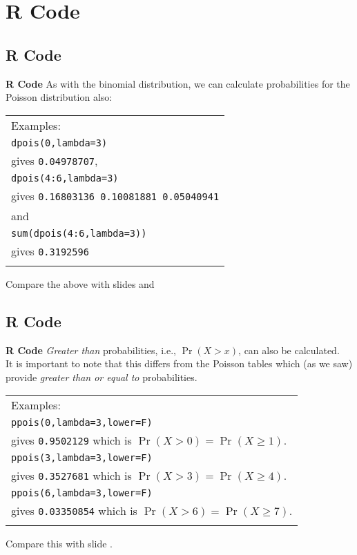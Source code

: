 \documentclass[compress]{beamer}        %
\makeatletter
\newcommand{\tcb}{\textcolor{beamer@blendedblue}}
\makeatother
\begin{document}
\section{R Code}
\subsection{R Code}
\begin{frame}{\bf \tcb{R Code}}
As with the binomial distribution, we can calculate probabilities for the Poisson distribution also:\\[0.3cm]

\begin{tabular}{|l|}
\hline
Examples: \\[0.2cm]
\texttt{dpois(0,lambda=3)} \\
gives \texttt{0.04978707}, \\[0.2cm]
\texttt{dpois(4:6,lambda=3)} \\
gives \texttt{0.16803136 0.10081881 0.05040941}\\[0.2cm]
and\\[0.2cm]
\texttt{sum(dpois(4:6,lambda=3))} \\
gives \texttt{0.3192596}\\
\hline
\multicolumn{1}{c}{}\\[0.1cm]
\end{tabular}

Compare the above with slides \pageref{poisexample} and \pageref{poisranexample}
\end{frame}



\subsection{R Code}
\begin{frame}{\bf \tcb{R Code}}
\emph{Greater than} probabilities, i.e., $\Pr(X > x)$, can also be calculated.\\[0.4cm]
It is important to note that this differs from the Poisson tables which (as we saw) provide \emph{greater than or equal to} probabilities.\\[0.4cm]

\begin{tabular}{|l|}
\hline
Examples: \\[0.2cm]
\texttt{ppois(0,lambda=3,lower=F)} \\
gives \texttt{0.9502129} which is $\Pr(X > 0) = \Pr(X \ge 1)$.\\[0.2cm]
\texttt{ppois(3,lambda=3,lower=F)} \\
gives \texttt{0.3527681} which is $\Pr(X > 3) = \Pr(X \ge 4)$.\\[0.2cm]
\texttt{ppois(6,lambda=3,lower=F)} \\
gives \texttt{0.03350854} which is $\Pr(X > 6) = \Pr(X \ge 7)$.\\
\hline
\multicolumn{1}{c}{}\\[0.0cm]
\end{tabular}

Compare this with slide \pageref{poisexampletab}.
\end{frame}
\end{document}
